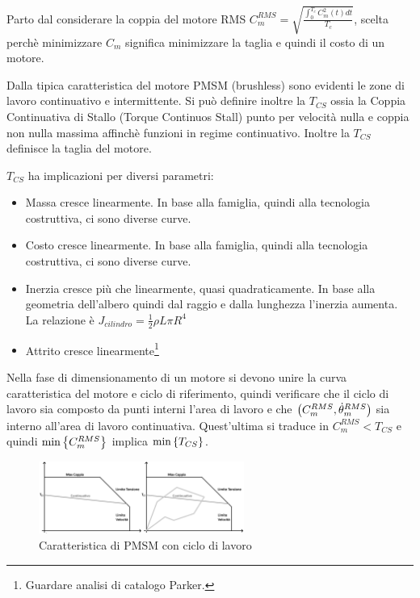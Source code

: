 Parto dal considerare la coppia del motore RMS \(C_m^{RMS} = \sqrt{\frac{\int_0^{T_c} C_m^2(t)dt}{T_c}}\), scelta perchè minimizzare \(C_m\) significa minimizzare la taglia e quindi il costo di un motore.

Dalla tipica caratteristica del motore PMSM (brushless) sono evidenti le zone di lavoro continuativo e intermittente.
Si può definire inoltre la \(T_{CS}\) ossia la Coppia Continuativa di Stallo (Torque Continuos Stall) punto per velocità nulla e coppia non nulla massima affinchè funzioni in regime continuativo. Inoltre la \(T_{CS}\) definisce la taglia del motore.

\(T_{CS}\) ha implicazioni per diversi parametri:
\begin{itemize}
    \item Massa cresce linearmente. In base alla famiglia, quindi alla tecnologia costruttiva, ci sono diverse curve.
    \item Costo cresce linearmente. In base alla famiglia, quindi alla tecnologia costruttiva, ci sono diverse curve.
    \item Inerzia cresce più che linearmente, quasi quadraticamente. In base alla geometria dell'albero quindi dal raggio e dalla lunghezza l'inerzia aumenta. La relazione è \(J_{cilindro} = \frac{1}{2} \rho L \pi R^4\)
    \item Attrito cresce linearmente\footnote{Guardare analisi di catalogo Parker.}
\end{itemize}

Nella fase di dimensionamento di un motore si devono unire la curva caratteristica del motore  e ciclo di riferimento, quindi verificare che il ciclo di lavoro sia composto da punti interni l'area di lavoro e che \(\left(C_m^{RMS},\dot{\theta}_m^{RMS} \right)\) sia interno all'area di lavoro continuativa.
Quest'ultima si traduce in \(C_m^{RMS} < T_{CS}\) e quindi \(\operatorname{min}\left\{ C_m^{RMS} \right\}\) implica \(\operatorname{min}\left\{ T_{CS} \right\}\).
\begin{figure}[h]
    \centering
    \includegraphics[width=0.6\textwidth]{Immagini/CaratteristicaPMSM.png}
    \caption{Caratteristica di PMSM con ciclo di lavoro}
\end{figure}

